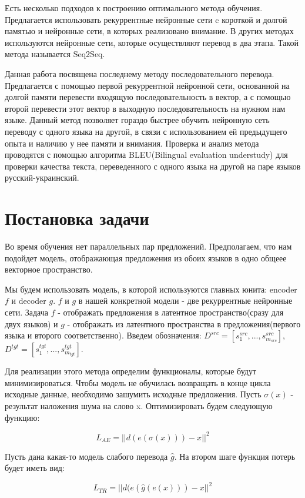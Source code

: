 \documentclass[12pt,twoside]{article}
\begin{document}
Есть несколько подходов к построению оптимального метода обучения. Предлагается использовать рекуррентные нейронные сети c короткой и долгой памятью и нейронные сети, в которых реализовано внимание. В других методах используются нейронные сети, которые осуществляют перевод в два этапа. Такой метода называется Seq2Seq\cite{weiss2017sequence}.

Данная работа посвящена последнему методу последовательного перевода. Предлагается с помощью первой рекуррентной нейронной сети, основанной на долгой памяти перевести входящую последовательность в вектор, а с помощью второй перевести этот вектор в выходную последовательность на нужном нам языке\cite{cho2014properties}. Данный метод позволяет
гораздо быстрее обучить нейронную сеть переводу с одного языка на другой, в связи с использованием ей предыдущего опыта и наличию у нее памяти и внимания. Проверка и анализ метода проводятся с помощью алгоритма BLEU(Bilingual evaluation understudy) для проверки качества текста, переведенного с одного языка на другой на паре языков русский-украинский.


\section{Постановка задачи}
Во время обучения нет параллельных пар предложений. Предполагаем, что нам подойдет модель, отображающая предложения из обоих языков в одно общеее векторное пространство.

Мы будем использовать модель, в которой используются главных юнита: encoder $f$ и decoder $g$. $f$ и $g$  в нашей конкретной модели -  две рекуррентные нейронные сети. Задача $f$  -  отображать предложения в  латентное пространство(сразу для двух языков) и $g$  -  отображать из латентного пространства в предложения(первого языка и второго соответственно).  Введем обозначения: $D^{src} = [s_1^{src},...,s_{m_{src}}^{src}]$, $D^{tgt} = [s_1^{tgt},...,s_{m_{tgt}}^{tgt}]$.

Для реализации этого метода определим функционалы, которые будут минимизироваться. Чтобы модель не обучилась возвращать в конце цикла исходные данные, необходимо зашумить исходные предложения. Пусть $\sigma(x)$ - результат наложения шума на слово x.  Оптимизировать будем  следующую функцию:

$$L_{AE} = ||d(e(\sigma(x)))-x||^2$$

Пусть дана какая-то модель слабого перевода $\hat{g}$. На втором шаге  функция потерь будет иметь вид:

$$L_{TR} = ||d(e(\hat{g}(e(x))) - x||^2$$
\end{document}
